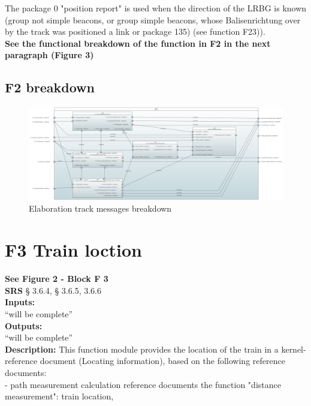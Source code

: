 \documentclass{template/openetcs_report}
\begin{document}
The package 0 "position report" is used when the direction of the LRBG is known (group 
not simple beacons, or group simple beacons, whose Balisenrichtung over by the track 
was positioned a link or package 135) (see function F23)).\\
 	
 \textbf{See the functional breakdown of the function in F2 in the next paragraph (Figure 3)}\\
 
\subsection{F2 breakdown}	
 \begin{figure}[hbtp]
\centering
\includegraphics [angle=90, scale=0.3] {images/F2_Breakdown}
\caption{Elaboration track messages breakdown}
\end{figure}

\newpage
\section{F3 Train loction}
\textbf{See Figure 2 - Block F 3}\\

\textbf{SRS} § 3.6.4, § 3.6.5, 3.6.6\\

  \textbf{Inputs:}\\
``will be complete''\\

 \textbf{Outputs:}\\
 ``will be complete''\\
 
\textbf{Description:} 
This function module provides the location of the train in a kernel-reference document 
(Locating information), based on the following reference documents: \\

- path measurement calculation reference documents the function "distance measurement": train location, \\
\end{document}
